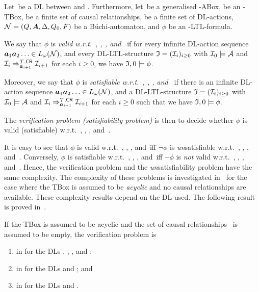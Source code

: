 \begin{definition}
    Let~\Lmc be a DL between \ALC and \ALCQIO.  Furthermore, let~\Amc be a
    generalised \Lmc-ABox, \Tmc be an \Lmc-TBox, \CR be a finite set of causal
    relationships, \Abf be a finite set of DL-actions,
    $\mathcal{N}=(Q,\boldsymbol A,\Delta,Q_0,F)$ be a Büchi-automaton, and $\phi$ be an
    \Lmc-LTL-formula.

    We say that $\phi$ is \emph{valid w.r.t.~\Amc, \Tmc, \CR, and~\Nmc} if for
    every infinite DL-action sequence $\boldsymbol a_1\boldsymbol a_2\dotso\in L_\omega(\mathcal{N})$,
    and every DL-LTL-structure $\mathfrak{I}=(\mathcal{I}_i)_{i\ge 0}$ with $\mathcal{I}_0\models\mathcal{A}$
    and $\mathcal{I}_i\Rightarrow_{\boldsymbol a_{i+1}}^{\mathcal{T},\mathsf{CR}}\mathcal{I}_{i+1}$ for each $i\ge 0$,
    we have $\mathfrak{I},0\models\phi$.

    Moreover, we say that $\phi$ is \emph{satisfiable w.r.t.~\Amc, \Tmc, \CR,
    and~\Nmc} if there is an infinite DL-action sequence
    $\boldsymbol a_1\boldsymbol a_2\dotso\in L_\omega(\mathcal{N})$, and a DL-LTL-structure
    $\mathfrak{I}=(\mathcal{I}_i)_{i\ge 0}$ with $\mathcal{I}_0\models\mathcal{A}$ and
    $\mathcal{I}_i\Rightarrow_{\boldsymbol a_{i+1}}^{\mathcal{T},\mathsf{CR}}\mathcal{I}_{i+1}$ for each $i\ge 0$ such
    that we have $\mathfrak{I},0\models\phi$.

    The \emph{verification problem (satisfiability problem)} is then to decide
    whether $\phi$ is valid (satisfiable) w.r.t.~\Amc, \Tmc, \CR, and~\Nmc.
\end{definition}

\noindent
It is easy to see that $\phi$ is valid w.r.t.~\Amc, \Tmc, \CR, and~\Nmc iff
$\lnot\phi$ is \emph{un}satisfiable w.r.t.~\Amc, \Tmc, \CR, and~\Nmc.
Conversely, $\phi$ is satisfiable w.r.t.~\Amc, \Tmc, \CR, and~\Nmc iff
$\lnot\phi$ is \emph{not} valid w.r.t.~\Amc, \Tmc, \CR, and~\Nmc.  Hence, the
verification problem and the \emph{un}satisfiability problem have the same
complexity.
%
The complexity of these problems is investigated in~\cite{BaLM-ECAI10} for the
case where the TBox is assumed to be \emph{acyclic} and no causal relationships
are available.  These complexity results depend on the DL used.  The following
result is proved in~\cite{BaLM-ECAI10,BaLM-LTCS-09-03}.

\begin{proposition}\label{prop:action-verification-acyclic-tbox}
    If the TBox is assumed to be acyclic and the set of causal relationships~\CR
    is assumed to be empty, the verification problem is
    \begin{enumerate}
        \item in \ExpSpace for the DLs \ALC, \ALCO, \ALCQ, and \ALCQO;
        \item in \TwoExpTime for the DLs \ALCI and \ALCIO; and
        \item in \coTwoNExpTime for the DLs \ALCQI and \ALCQIO.
    \end{enumerate}
\end{proposition}

